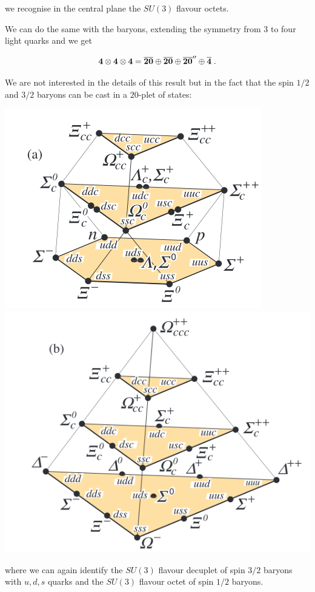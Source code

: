 \documentclass[12pt]{article}
\begin{document}
we recognise in the central plane the $SU(3)$ flavour octets.

We can do the same with the baryons, extending the symmetry from 3 to four light quarks and we get

\[{\bf 4}\otimes {\bf 4}\otimes {\bf 4}={\bf \overline{20} }\oplus{\bf \overline{20} }\oplus {\bf \overline{20}''}\oplus {\bf \overline{4}}\;.\]

We are not interested in the details of this result but in the fact that the spin $1/2$ and $3/2$ baryons can be cast in a $20$-plet of states:

\includegraphics[scale=0.4]{images/baryonsCa.png}
\includegraphics[scale=0.4]{images/baryonsCb.png}

where we can again identify the $SU(3)$ flavour decuplet of spin $3/2$ baryons with $u,d,s$ quarks and the $SU(3)$ flavour octet of spin $1/2$ baryons.
\end{document}
